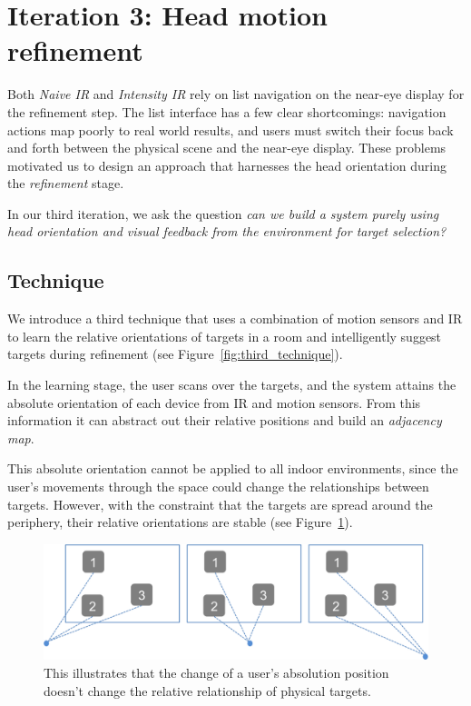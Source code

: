 \section{Iteration 3: Head motion refinement}
\label{sec:iteration-3:-head}

Both {\em Naive IR} and {\em Intensity IR} rely on list navigation on the
near-eye display for the refinement step. The list interface has a few clear
shortcomings: navigation actions map poorly to real world results, and
users must switch their focus back and forth between the physical scene and the
near-eye display. These problems motivated us to design an approach that
harnesses the head orientation during the {\em refinement} stage.

In our third iteration, we ask the question {\em can we build a system purely
using head orientation and visual feedback from the environment for target
selection?}

\subsection{Technique}

We introduce a third technique that uses a combination of motion sensors and IR
to learn the relative orientations of targets in a room and intelligently
suggest targets during refinement (see Figure~\ref{fig:third_technique}).

In the learning stage, the user scans over the targets, and the system attains
the absolute orientation of each device from IR and motion sensors. From this
information it can abstract out their relative positions and build an {\em
adjacency map}.

This absolute orientation cannot be applied to all indoor environments, since
the user’s movements through the space could change the relationships between
targets. However, with the constraint that the targets are spread around the
periphery, their relative orientations are stable (see
Figure~\ref{fig:third_principle}).

\begin{figure}[t]
\centering
\includegraphics[width=0.95\columnwidth]{figures/third_principle.png}
\caption{This illustrates that the change of a user's absolution position
doesn't change the relative relationship of physical targets.}
\label{fig:third_principle}
\end{figure}


